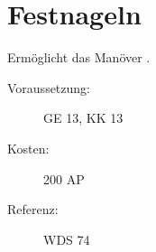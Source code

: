 \section{Festnageln}
\label{sf.festnageln}
Ermöglicht das Manöver .
\begin{description}
    \item[Voraussetzung:]
        GE 13, KK 13
    \item [Kosten:]
        200 AP
    \item [Referenz:]
        WDS 74
\end{description}

